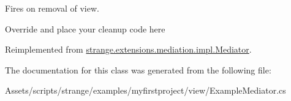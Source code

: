 Fires on removal of view. 

Override and place your cleanup code here 

Reimplemented from \hyperlink{classstrange_1_1extensions_1_1mediation_1_1impl_1_1_mediator_a9c65534ae8c37db9f4db7c84a94cd635}{strange.\-extensions.\-mediation.\-impl.\-Mediator}.



The documentation for this class was generated from the following file\-:\begin{DoxyCompactItemize}
\item 
Assets/scripts/strange/examples/myfirstproject/view/Example\-Mediator.\-cs\end{DoxyCompactItemize}
